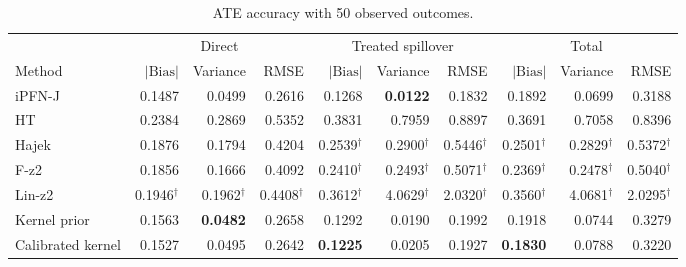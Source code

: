 \begin{table}[tb]
\centering
\caption{ATE accuracy with 50 observed outcomes.}
\begingroup\footnotesize
\setlength{\tabcolsep}{3pt}
\begin{tabular*}{\linewidth}{@{\extracolsep{\fill}}l*{9}{r}@{}}
\toprule
&\multicolumn{3}{c}{Direct}&\multicolumn{3}{c}{Treated spillover}&\multicolumn{3}{c}{Total}\\
\cmidrule(lr){2-4}\cmidrule(lr){5-7}\cmidrule(lr){8-10}
Method&$|\mathrm{Bias}|$&Variance&RMSE&$|\mathrm{Bias}|$&Variance&RMSE&$|\mathrm{Bias}|$&Variance&RMSE\\
\midrule
iPFN-J & \cellcolor{blue!17}0.1487 & \cellcolor{blue!7}0.0499 & \cellcolor{blue!17}0.2616 & \cellcolor{blue!11}0.1268 & \cellcolor{blue!24}\textbf{0.0122} & \cellcolor{blue!17}0.1832 & \cellcolor{blue!11}0.1892 & \cellcolor{blue!17}0.0699 & \cellcolor{blue!17}0.3188 \\
HT & \cellcolor{blue!1}0.2384 & \cellcolor{blue!1}0.2869 & \cellcolor{blue!1}0.5352 & \cellcolor{blue!2}0.3831 & \cellcolor{blue!2}0.7959 & \cellcolor{blue!2}0.8897 & \cellcolor{blue!2}0.3691 & \cellcolor{blue!2}0.7058 & \cellcolor{blue!2}0.8396 \\
Hajek & \cellcolor{blue!1}0.1876 & \cellcolor{blue!1}0.1794 & \cellcolor{blue!1}0.4204 & 0.2539$^{\dagger}$ & 0.2900$^{\dagger}$ & 0.5446$^{\dagger}$ & 0.2501$^{\dagger}$ & 0.2829$^{\dagger}$ & 0.5372$^{\dagger}$ \\
F-z2 & \cellcolor{blue!2}0.1856 & \cellcolor{blue!2}0.1666 & \cellcolor{blue!2}0.4092 & 0.2410$^{\dagger}$ & 0.2493$^{\dagger}$ & 0.5071$^{\dagger}$ & 0.2369$^{\dagger}$ & 0.2478$^{\dagger}$ & 0.5040$^{\dagger}$ \\
Lin-z2 & 0.1946$^{\dagger}$ & 0.1962$^{\dagger}$ & 0.4408$^{\dagger}$ & 0.3612$^{\dagger}$ & 4.0629$^{\dagger}$ & 2.0320$^{\dagger}$ & 0.3560$^{\dagger}$ & 4.0681$^{\dagger}$ & 2.0295$^{\dagger}$ \\
Kernel prior & \cellcolor{blue!4}0.1563 & \cellcolor{blue!24}\textbf{0.0482} & \cellcolor{blue!4}0.2658 & \cellcolor{blue!4}0.1292 & \cellcolor{blue!7}0.0190 & \cellcolor{blue!4}0.1992 & \cellcolor{blue!4}0.1918 & \cellcolor{blue!7}0.0744 & \cellcolor{blue!4}0.3279 \\
Calibrated kernel & \cellcolor{blue!7}0.1527 & \cellcolor{blue!11}0.0495 & \cellcolor{blue!7}0.2642 & \cellcolor{blue!24}\textbf{0.1225} & \cellcolor{blue!4}0.0205 & \cellcolor{blue!7}0.1927 & \cellcolor{blue!24}\textbf{0.1830} & \cellcolor{blue!4}0.0788 & \cellcolor{blue!7}0.3220 \\

\end{tabular*}
\end{table}
